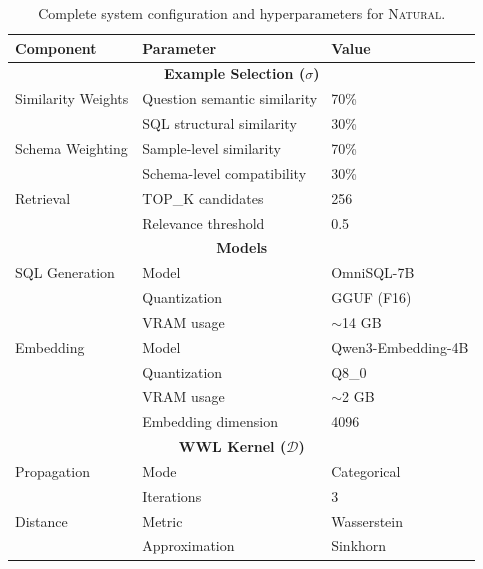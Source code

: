 \begin{table}[ht]
\centering
\small
\begin{tabular}{lll}
\toprule
\textbf{Component} & \textbf{Parameter} & \textbf{Value} \\
\midrule
\multicolumn{3}{c}{\textbf{Example Selection ($\sigma$)}} \\
\midrule
Similarity Weights & Question semantic similarity & 70\% \\
                   & SQL structural similarity    & 30\% \\
Schema Weighting   & Sample-level similarity      & 70\% \\
                   & Schema-level compatibility   & 30\% \\
Retrieval          & TOP\_K candidates            & 256 \\
                   & Relevance threshold          & 0.5 \\
\midrule
\multicolumn{3}{c}{\textbf{Models}} \\
\midrule
SQL Generation     & Model                        & OmniSQL-7B \\
                   & Quantization                 & GGUF (F16) \\
                   & VRAM usage                   & $\sim$14 GB \\
Embedding          & Model                        & Qwen3-Embedding-4B \\
                   & Quantization                 & Q8\_0 \\
                   & VRAM usage                   & $\sim$2 GB \\
                   & Embedding dimension          & 4096 \\
\midrule
\multicolumn{3}{c}{\textbf{WWL Kernel ($\mathcal{D}$)}} \\
\midrule
Propagation        & Mode                         & Categorical \\
                   & Iterations                   & 3 \\
Distance           & Metric                       & Wasserstein \\
                   & Approximation                & Sinkhorn \\
\bottomrule
\end{tabular}
\caption{Complete system configuration and hyperparameters for \textsc{Natural}.}
\label{tab:system-config}
\end{table}
